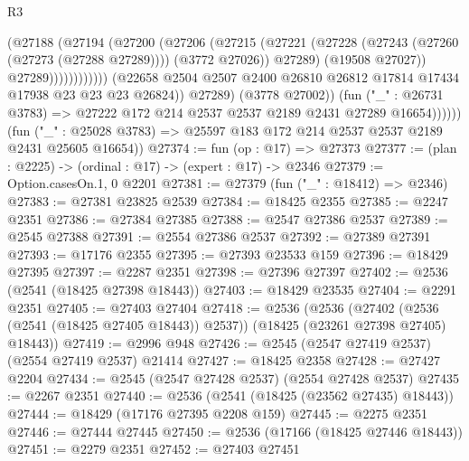 \begin{lexlean}{R3}
\begin{coremodule}
                                      (@27188
                                        (@27194
                                          (@27200
                                            (@27206
                                              (@27215
                                                (@27221
                                                  (@27228
                                                    (@27243 (@27260 (@27273 (@27288 @27289))))
                                                    (@3772 @27026))
                                                  @27289)
                                                (@19508 @27027))
                                              @27289))))))))))))
                      (@22658
                        @2504
                        @2507
                        @2400
                        @26810
                        @26812
                        @17814
                        @17434
                        @17938
                        @23
                        @23
                        @23
                        @26824))
                    @27289)
                  (@3778 @27002))
                (fun ("_" : @26731 @3783) =>
                @27222 @172 @214 @2537 @2537 @2189 @2431 @27289 @16654))))))
      (fun ("_" : @25028 @3783) => @25597 @183 @172 @214 @2537 @2537 @2189 @2431 @25605 @16654))
@27374 := fun (op : @17) => @27373
@27377 := (plan : @2225) -> (ordinal : @17) -> (expert : @17) -> @2346
@27379 := Option.casesOn.{1, 0} @2201
@27381 := @27379 (fun ("_" : @18412) => @2346)
@27383 := @27381 @23825 @2539
@27384 := @18425 @2355
@27385 := @2247 @2351
@27386 := @27384 @27385
@27388 := @2547 @27386 @2537
@27389 := @2545 @27388
@27391 := @2554 @27386 @2537
@27392 := @27389 @27391
@27393 := @17176 @2355
@27395 := @27393 @23533 @159
@27396 := @18429 @27395
@27397 := @2287 @2351
@27398 := @27396 @27397
@27402 := @2536 (@2541 (@18425 @27398 @18443))
@27403 := @18429 @23535
@27404 := @2291 @2351
@27405 := @27403 @27404
@27418 := @2536
    (@2536
      (@27402 (@2536 (@2541 (@18425 @27405 @18443)) @2537))
      (@18425 (@23261 @27398 @27405) @18443))
@27419 := @2996 @948
@27426 := @2545 (@2547 @27419 @2537) (@2554 @27419 @2537) @21414
@27427 := @18425 @2358
@27428 := @27427 @2204
@27434 := @2545 (@2547 @27428 @2537) (@2554 @27428 @2537)
@27435 := @2267 @2351
@27440 := @2536 (@2541 (@18425 (@23562 @27435) @18443))
@27444 := @18429 (@17176 @27395 @2208 @159)
@27445 := @2275 @2351
@27446 := @27444 @27445
@27450 := @2536 (@17166 (@18425 @27446 @18443))
@27451 := @2279 @2351
@27452 := @27403 @27451

\end{coremodule}
\end{lexlean}
